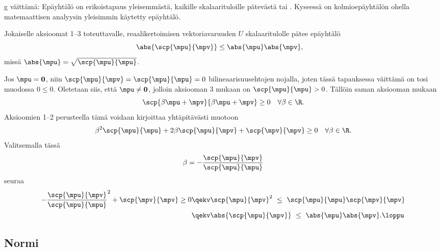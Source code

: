 g väittämä: Epäyhtälö on erikoistapaus yleisemmästä, kaikille 
skalaarituloille pätevästä  tai . Kyseessä on
kolmioepäyhtälön ohella matemaattisen analyysin yleisimmin käytetty epäyhtälö.
\begin{Lause}  \label{schwarzR}
 Jokaiselle aksioomat 1--3 toteuttavalle,
reaalikertoimisen vektoriavaruuden $U$ skalaaritulolle pätee epäyhtälö
\[
\abs{\scp{\mpu}{\mpv}} \le \abs{\mpu} \abs{\mpv}, \quad 
\]                            
missä $\abs{\mpu}=\sqrt{\scp{\mpu}{\mpu}}$.
\end{Lause}
\tod Jos $\mpu=\mathbf{0}$, niin $\scp{\mpu}{\mpv}=\scp{\mpu}{\mpu}=0$ bilineaarisuusehtojen
nojalla, joten tässä tapauksessa väittämä on tosi muodossa $0 \leq 0$. Oletetaan siis, että 
$\mpu \neq \mathbf{0}$, jolloin aksiooman 3 mukaan on $\scp{\mpu}{\mpu} > 0$. Tällöin saman 
aksiooman mukaan 
\[
\scp{\beta \mpu + \mpv}{\beta \mpu + \mpv} \geq 0 \quad \forall \beta \in \R.
\]
Aksioomien 1--2 perusteella tämä voidaan kirjoittaa yhtäpitävästi muotoon
\[
\beta^2\scp{\mpu}{\mpu} + 2 \beta \scp{\mpu}{\mpv} 
                        + \scp{\mpv}{\mpv} \geq 0 \quad \forall \beta \in \R.
\]
Valitsemalla tässä
\[
\beta=-\frac{\scp{\mpu}{\mpv}}{\scp{\mpu}{\mpu}}
\]
seuraa
\begin{align*}
-\frac{\scp{\mpu}{\mpv}}{\scp{\mpu}{\mpu}}^2+\scp{\mpv}{\mpv} \geq 0
            &\qekv \scp{\mpu}{\mpv}^2 \ \leq \ \scp{\mpu}{\mpu}\scp{\mpv}{\mpv} \\
            &\qekv \abs{\scp{\mpu}{\mpv}} \ \leq \ \abs{\mpu} \abs{\mpv}. \loppu
\end{align*}

\subsection*{Normi}

